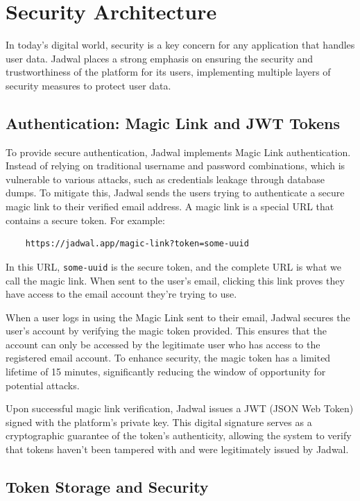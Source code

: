 \documentclass[12pt,a4paper,twoside]{report}
\begin{document}
\section{Security Architecture}

In today's digital world, security is a key concern for any application that handles user data. Jadwal places a strong emphasis on ensuring the security and trustworthiness of the platform for its users, implementing multiple layers of security measures to protect user data.

\subsection{Authentication: Magic Link and JWT Tokens}

To provide secure authentication, Jadwal implements Magic Link authentication. Instead of relying on traditional username and password combinations, which is vulnerable to various attacks, such as credentials leakage through database dumps. To mitigate this, Jadwal sends the users trying to authenticate a secure magic link to their verified email address. A magic link is a special URL that contains a secure token. For example:

\begin{verbatim}
    https://jadwal.app/magic-link?token=some-uuid
\end{verbatim}

In this URL, \texttt{some-uuid} is the secure token, and the complete URL is what we call the magic link. When sent to the user's email, clicking this link proves they have access to the email account they're trying to use.

When a user logs in using the Magic Link sent to their email, Jadwal secures the user's account by verifying the magic token provided. This ensures that the account can only be accessed by the legitimate user who has access to the registered email account. To enhance security, the magic token has a limited lifetime of 15 minutes, significantly reducing the window of opportunity for potential attacks.

Upon successful magic link verification, Jadwal issues a JWT (JSON Web Token) signed with the platform's private key. This digital signature serves as a cryptographic guarantee of the token's authenticity, allowing the system to verify that tokens haven't been tampered with and were legitimately issued by Jadwal.

\subsection{Token Storage and Security}
\end{document}

